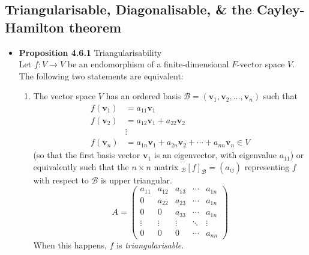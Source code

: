 \documentclass[11pt,a4paper]{article}
\begin{document}
\subsection{Triangularisable, Diagonalisable, \& the Cayley-Hamilton theorem}

\begin{itemize}
    \item \textbf{Proposition 4.6.1} Triangularisability \\
        Let $f : V \to V$ be an endomorphism of a finite-dimensional $F$-vector space $V$.
        The following two statements are equivalent:
        \begin{enumerate}
            \item The vector space $V$ has an ordered basis
                $\mathcal{B} = (\textbf{v}_1, \textbf{v}_2, \ldots, \textbf{v}_n)$ such that
                \begin{align*}{}
                    f(\textbf{v}_1) &= a_{11}\textbf{v}_1 \\
                    f(\textbf{v}_2) &= a_{12}\textbf{v}_1 + a_{22}\textbf{v}_2 \\
                                    &\vdots \\
                    f(\textbf{v}_n) &= a_{1n}\textbf{v}_1 + a_{2n}\textbf{v}_2 + \cdots +
                    a_{nn}\textbf{v}_n \in V
                \end{align*}
                (so that the first basis vector $\textbf{v}_1$ is an eigenvector,
                with eigenvalue $a_{11}$) or equivalently such that the $n \times n$ matrix
                $_\mathcal{B}{[f]}_\mathcal{B} = (a_{ij})$ representing $f$ with respect to
                $\mathcal{B}$ is upper triangular.
                \[
                    A =
                    \begin{pmatrix}{}
                        a_{11} & a_{12} & a_{13} & \cdots & a_{1n} \\
                        0      & a_{22} & a_{23} & \cdots & a_{1n} \\
                        0      & 0      & a_{33} & \cdots & a_{1n} \\
                        \vdots & \vdots & \vdots & \ddots & \vdots \\
                        0      & 0      & 0      & \cdots & a_{nn}
                    \end{pmatrix}
                \]
                When this happens, $f$ is \emph{triangularisable}.


\end{enumerate}
\end{itemize}
\end{document}
